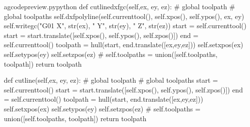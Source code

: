 \documentclass{ltxdoc}
\begin{document}
\lstset{firstnumber=\thegcpy}
\begin{writecode}{a}{gcodepreview.py}{python}
    def cutlinedxfgc(self,ex, ey, ez):
#        global toolpath
#        global toolpaths
        self.dxfpolyline(self.currenttool(), self.xpos(), self.ypos(), ex, ey)
        self.writegc("G01 X", str(ex), " Y", str(ey), " Z", str(ez))
        start = self.currenttool()
        start = start.translate([self.xpos(), self.ypos(), self.zpos()])
        end = self.currenttool()
        toolpath = hull(start, end.translate([ex,ey,ez]))
        self.setxpos(ex)
        self.setypos(ey)
        self.setzpos(ez)
#        self.toolpaths = union([self.toolpaths, toolpath])
        return toolpath
        
    def cutline(self,ex, ey, ez):
#        global toolpath
#        global toolpaths
        start = self.currenttool()
        start = start.translate([self.xpos(), self.ypos(), self.zpos()])
        end = self.currenttool()
        toolpath = hull(start, end.translate([ex,ey,ez]))
        self.setxpos(ex)
        self.setypos(ey)
        self.setzpos(ez)
#        self.toolpaths = union([self.toolpaths, toolpath])
        return toolpath

\end{writecode}
\addtocounter{gcpy}{28}

%
\end{document}
